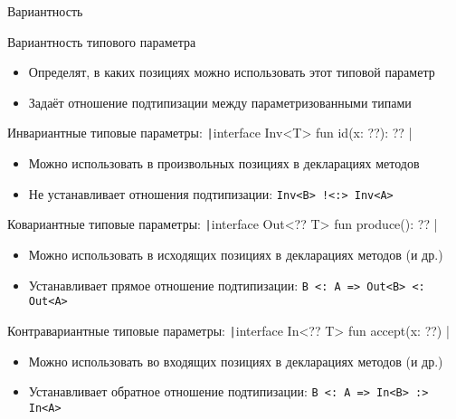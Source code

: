 \documentclass[aspectratio=169,usenames,dvipsnames]{beamer}
\begin{document}
    \begin{frame}{Вариантность}
        \begin{block}{Вариантность типового параметра}
            \begin{itemize}
                \item Определят, в каких позициях можно использовать этот типовой параметр
                \item Задаёт отношение подтипизации между параметризованными типами
            \end{itemize}
        \end{block}
        \begin{block}{Инвариантные типовые параметры: \texttt|interface Inv<T> { fun id(x: ??): ?? }|}
            \begin{itemize}
                \item Можно использовать в произвольных позициях в декларациях методов
                \item Не устанавливает отношения подтипизации: \texttt{Inv<B> !<:> Inv<A>}
            \end{itemize}
        \end{block}
        \begin{block}{Ковариантные типовые параметры: \texttt|interface Out<?? T> { fun produce(): ?? }|}
            \begin{itemize}
                \item Можно использовать в исходящих позициях в декларациях методов (и др.)
                \item Устанавливает прямое отношение подтипизации: \texttt{B <: A => Out<B> <: Out<A>}
            \end{itemize}
        \end{block}
        \begin{block}{Контравариантные типовые параметры: \texttt|interface In<?? T> { fun accept(x: ??) }|}
            \begin{itemize}
                \item Можно использовать во входящих позициях в декларациях методов (и др.)
                \item Устанавливает обратное отношение подтипизации: \texttt{B <: A => In<B> :> In<A>}
            \end{itemize}
        \end{block}
    \end{frame}
\end{document}
